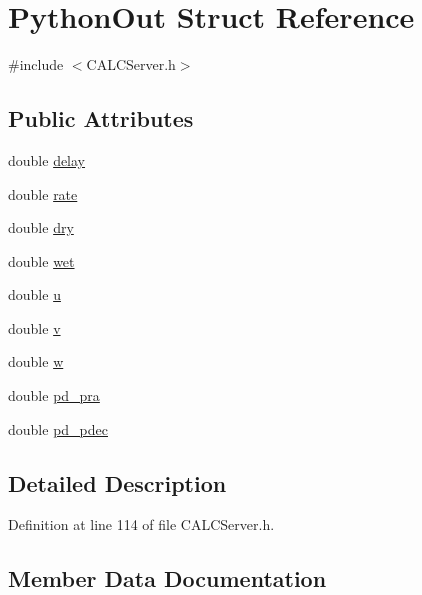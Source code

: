 \hypertarget{struct_python_out}{}\section{Python\+Out Struct Reference}
\label{struct_python_out}


{\ttfamily \#include $<$C\+A\+L\+C\+Server.\+h$>$}

\subsection*{Public Attributes}
\begin{DoxyCompactItemize}
\item 
double \hyperlink{struct_python_out_ac4eead723ebdeb8d63f5dce35a12ee18}{delay}
\item 
double \hyperlink{struct_python_out_a30aebb8233212f3fdd75b1d2e7d39c41}{rate}
\item 
double \hyperlink{struct_python_out_a16d779a59480222faecb242797935998}{dry}
\item 
double \hyperlink{struct_python_out_a8b8576f7f276ee49f554c2944d321e8d}{wet}
\item 
double \hyperlink{struct_python_out_a95ee21e074791ce3832cc312e513c075}{u}
\item 
double \hyperlink{struct_python_out_a560f7c928e5104bbc64c242abf83bd26}{v}
\item 
double \hyperlink{struct_python_out_a67197a5152793612cf2c52ab0cfb5849}{w}
\item 
double \hyperlink{struct_python_out_a695e03fc5653156952d1357e768d1ce6}{pd\+\_\+pra}
\item 
double \hyperlink{struct_python_out_ac85c9eafa7be8e3c5008c044ae5903ed}{pd\+\_\+pdec}
\end{DoxyCompactItemize}


\subsection{Detailed Description}


Definition at line 114 of file C\+A\+L\+C\+Server.\+h.



\subsection{Member Data Documentation}
\mbox{\label{struct_python_out_ac4eead723ebdeb8d63f5dce35a12ee18}} 
